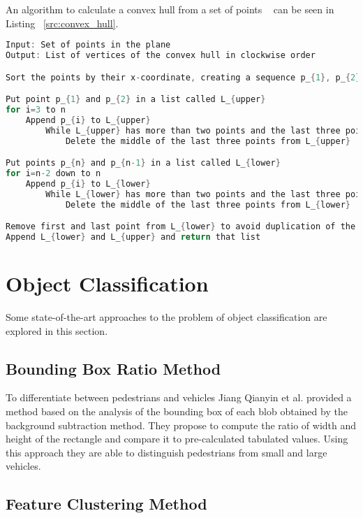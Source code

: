 An algorithm to calculate a convex hull from a set of points ~\cite{berg_computational_2008} can be seen in Listing ~\ref{src:convex_hull}.

\begin{lstlisting}[float,language=C, label={src:convex_hull}, caption=Convex Hull calculation] 
Input: Set of points in the plane
Output: List of vertices of the convex hull in clockwise order

Sort the points by their x-coordinate, creating a sequence p_{1}, p_{2}, ..., p_{n}

Put point p_{1} and p_{2} in a list called L_{upper}
for i=3 to n
	Append p_{i} to L_{upper}
		While L_{upper} has more than two points and the last three points don't form a right turn
			Delete the middle of the last three points from L_{upper}

Put points p_{n} and p_{n-1} in a list called L_{lower}
for i=n-2 down to n
	Append p_{i} to L_{lower}
		While L_{lower} has more than two points and the last three points don't form a right turn
			Delete the middle of the last three points from L_{lower}

Remove first and last point from L_{lower} to avoid duplication of the points where the upper and the lower hull meet
Append L_{lower} and L_{upper} and return that list
\end{lstlisting}

\section{Object Classification}

Some state-of-the-art approaches to the problem of object classification are explored in this section. 

\subsection{Bounding Box Ratio Method}

To differentiate between pedestrians and vehicles Jiang Qianyin et al. \cite{qianyin_model_2015} provided a method based on the analysis of the bounding box of each blob obtained by the background subtraction method. They propose to compute the ratio of width and height of the rectangle and compare it to pre-calculated tabulated values. Using this approach they are able to distinguish pedestrians from small and large vehicles.

\subsection{Feature Clustering Method}


